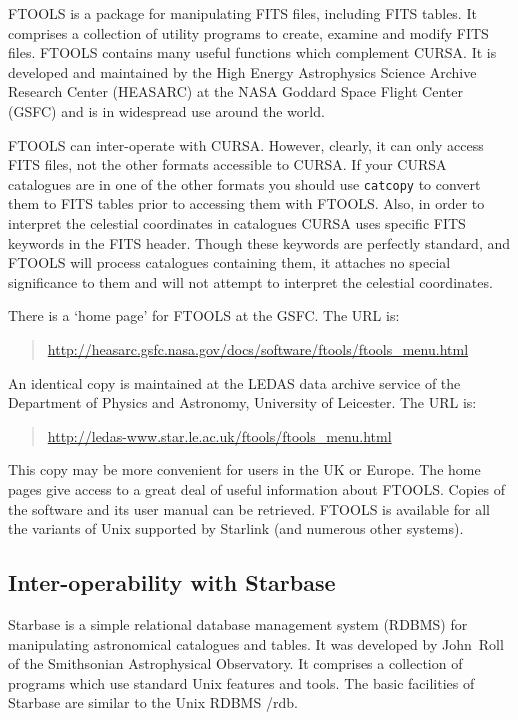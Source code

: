 \documentclass[twoside,11pt]{starlink}
\begin{document}
FTOOLS is a package for manipulating FITS files, including FITS tables.
It comprises a collection of utility programs to create, examine and
modify FITS files.  FTOOLS contains many useful functions which
complement CURSA.  It is developed and maintained by the High Energy
Astrophysics Science Archive Research Center (HEASARC) at the NASA
Goddard Space Flight Center (GSFC) and is in widespread use around the
world.

FTOOLS can inter-operate with CURSA.  However, clearly, it can only
access FITS files, not the other formats accessible to CURSA.  If
your CURSA catalogues are in one of the other formats you should use
\texttt{catcopy} to convert them to FITS tables prior to accessing them
with FTOOLS.  Also, in order to interpret the celestial coordinates
in catalogues CURSA uses specific FITS keywords in the FITS header.
Though these keywords are perfectly standard, and FTOOLS will process
catalogues containing them, it attaches no special significance to them
and will not attempt to interpret the celestial coordinates.

There is a `home page' for FTOOLS at the GSFC.  The URL is:

\begin{quote}
\url{http://heasarc.gsfc.nasa.gov/docs/software/ftools/ftools_menu.html}
\end{quote}

An identical copy is maintained at the LEDAS data archive service of
the Department of Physics and Astronomy, University of Leicester.  The
URL is:

\begin{quote}
\url{http://ledas-www.star.le.ac.uk/ftools/ftools_menu.html}
\end{quote}

This copy may be more convenient for users in the UK or Europe.  The
home pages give access to a great deal of useful information about
FTOOLS.  Copies of the software and its user manual can be retrieved.
FTOOLS is available for all the variants of Unix supported by Starlink
(and numerous other systems).

\subsection{\label{STARBASE}Inter-operability with Starbase}

Starbase is a simple relational database management system (RDBMS)
for manipulating astronomical catalogues and tables.  It was developed
by John~Roll of the Smithsonian Astrophysical Observatory.  It comprises
a collection of programs which use standard Unix features and tools.  The
basic facilities of Starbase are similar to the Unix RDBMS /rdb.
\end{document}
